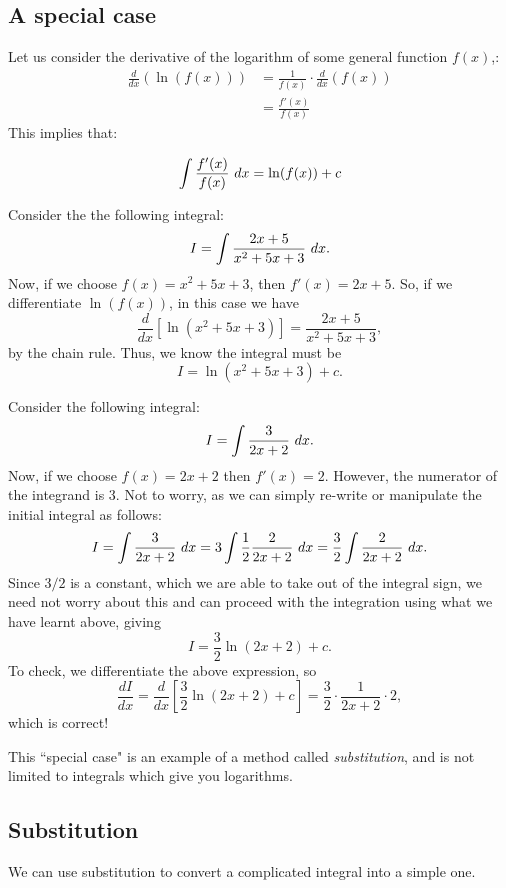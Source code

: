 \subsection{A special case}
Let us consider the derivative of the logarithm of some general function $f(x)$,:
\begin{align*}
\frac{d}{dx}\left(\ln(f(x))\right)&=\frac{1}{f(x)}\cdot\frac{d}{dx}\left(f(x)\right)\\
&=\frac{f'(x)}{f(x)}
\end{align*}
This implies that:
\begin{in_a_box}
\[\int \frac{f'(x)}{f(x)}\ dx=\ln(f(x))+c\]
\end{in_a_box}

\begin{example}
Consider the the following integral:
\[I=\int \frac{2x+5}{x^2+5x+3}\ dx.\]
Now, if we choose $f(x)=x^2+5x+3$, then $f'(x)=2x+5$. So, if we differentiate $\ln(f(x))$, in this case we have
\[\frac{d}{dx}\left[\ln(x^2+5x+3)\right]=\frac{2x+5}{x^2+5x+3},\]
by the chain rule. Thus, we know the integral must be
\[I=\ln(x^2+5x+3)+c.\]
\end{example}

\begin{example}
Consider the following integral:
\[I=\int \frac{3}{2x+2}\ dx.\]
Now, if we choose $f(x)=2x+2$ then $f'(x)=2$. However, the numerator of the integrand is 3. Not to worry, as we can simply re-write or manipulate the initial integral as follows:
\[I=\int \frac{3}{2x+2}\ dx=3\int\frac{1}{2}\frac{2}{2x+2}\ dx=\frac{3}{2}\int\frac{2}{2x+2}\ dx.\]
Since $3/2$ is a constant, which we are able to take out of the integral sign, we need not worry about this and can proceed with the integration using what we have learnt above, giving
\[I=\frac{3}{2}\ln(2x+2)+c.\]
To check, we differentiate the above expression, so
\[\frac{dI}{dx}=\frac{d}{dx}\left[\frac{3}{2}\ln(2x+2)+c\right]=\frac{3}{2}\cdot\frac{1}{2x+2}\cdot2,\]
which is correct!
\end{example}

This ``special case" is an example of a method called {\it substitution}, and is not limited to integrals which give you logarithms.

\subsection{Substitution}
We can use substitution to convert a complicated integral into a simple one.

